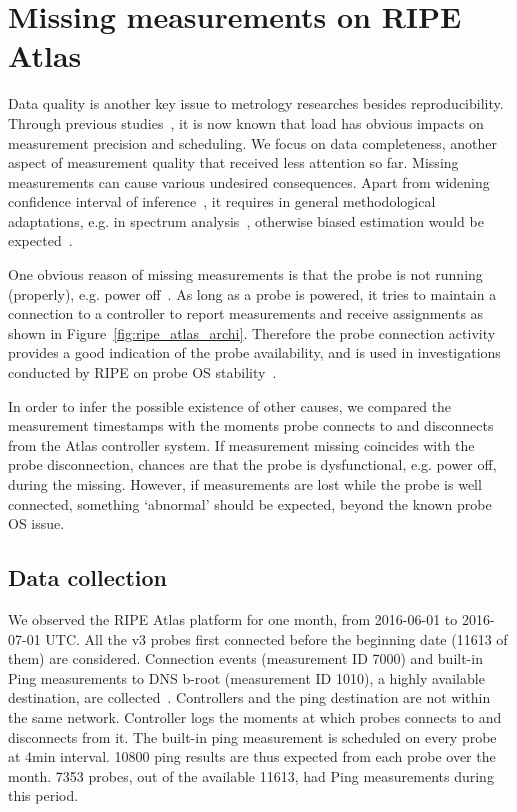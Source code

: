\section{Missing measurements on RIPE Atlas}
\label{sec:miss_atlas}
Data quality is another key issue to metrology researches besides reproducibility.
Through previous studies~\cite{Holterbach2015a, Bajpai2015}, it is now known that load has obvious impacts on measurement precision and scheduling.
We focus on data completeness, another aspect of measurement quality that received less attention so far. Missing measurements can cause various undesired consequences. 
Apart from widening confidence interval of inference~\cite{Fontugne2016}, it requires in general methodological adaptations, e.g. in spectrum analysis~\cite{Babu2010, Luckie2014, shao2016}, otherwise biased estimation would be expected~\cite{Baraldi2010}.

One obvious reason of missing measurements is that the probe is not running (properly), e.g. power off~\cite{schedule}.
As long as a probe is powered, it tries to maintain a connection to a controller to report measurements and receive assignments as shown in Figure~\ref{fig:ripe_atlas_archi}. 
Therefore the probe connection activity provides a good indication of the probe availability, and is used in investigations conducted by RIPE on probe OS stability~\cite{1look, 2look, 3look}.

In order to infer the possible existence of other causes, we compared the measurement timestamps with the moments probe connects to and disconnects from the Atlas controller system.
If measurement missing coincides with the probe disconnection, chances are that the probe is dysfunctional, e.g. power off,  during the missing. 
However, if measurements are lost while the probe is well connected, something `abnormal' should be expected, beyond the known probe OS issue.

\subsection{Data collection}
We observed the RIPE Atlas platform for one month, from 2016-06-01 to 2016-07-01 UTC.
All the v3 probes first connected before the beginning date (11613 of them) are considered.
Connection events (measurement ID 7000) and built-in Ping measurements to DNS b-root (measurement ID 1010), a highly available destination, are collected~\cite{built-in}. 
Controllers and the ping destination are not within the same network.
Controller logs the moments at which probes connects to and disconnects from it.
The built-in ping measurement is scheduled on every probe at 4min interval. 
10800 ping results are thus expected from each probe over the month.
7353 probes, out of the available 11613, had Ping measurements during this period.

